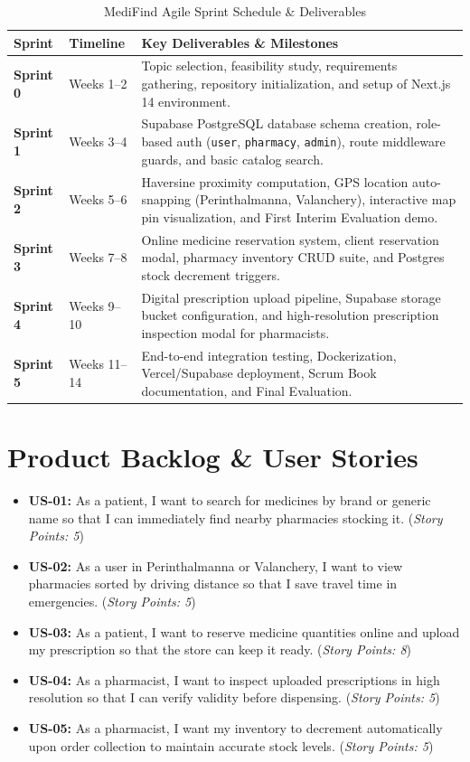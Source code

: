 \documentclass[12pt,a4paper]{report}
\begin{document}
\begin{table}[htbp]
\centering
\caption{MediFind Agile Sprint Schedule \& Deliverables}
\label{tab:sprint_schedule}
\begin{tabular}{p{1.8cm}p{2.5cm}p{10.5cm}}
\toprule
\textbf{Sprint} & \textbf{Timeline} & \textbf{Key Deliverables \& Milestones} \\
\midrule
\textbf{Sprint 0} & Weeks 1--2 & Topic selection, feasibility study, requirements gathering, repository initialization, and setup of Next.js 14 environment. \\
\textbf{Sprint 1} & Weeks 3--4 & Supabase PostgreSQL database schema creation, role-based auth (\texttt{user}, \texttt{pharmacy}, \texttt{admin}), route middleware guards, and basic catalog search. \\
\textbf{Sprint 2} & Weeks 5--6 & Haversine proximity computation, GPS location auto-snapping (Perinthalmanna, Valanchery), interactive map pin visualization, and First Interim Evaluation demo. \\
\textbf{Sprint 3} & Weeks 7--8 & Online medicine reservation system, client reservation modal, pharmacy inventory CRUD suite, and Postgres stock decrement triggers. \\
\textbf{Sprint 4} & Weeks 9--10 & Digital prescription upload pipeline, Supabase storage bucket configuration, and high-resolution prescription inspection modal for pharmacists. \\
\textbf{Sprint 5} & Weeks 11--14 & End-to-end integration testing, Dockerization, Vercel/Supabase deployment, Scrum Book documentation, and Final Evaluation. \\
\bottomrule
\end{tabular}
\end{table}

\section{Product Backlog & User Stories}
\begin{itemize}
    \item \textbf{US-01:} As a patient, I want to search for medicines by brand or generic name so that I can immediately find nearby pharmacies stocking it. (\textit{Story Points: 5})
    \item \textbf{US-02:} As a user in Perinthalmanna or Valanchery, I want to view pharmacies sorted by driving distance so that I save travel time in emergencies. (\textit{Story Points: 5})
    \item \textbf{US-03:} As a patient, I want to reserve medicine quantities online and upload my prescription so that the store can keep it ready. (\textit{Story Points: 8})
    \item \textbf{US-04:} As a pharmacist, I want to inspect uploaded prescriptions in high resolution so that I can verify validity before dispensing. (\textit{Story Points: 5})
    \item \textbf{US-05:} As a pharmacist, I want my inventory to decrement automatically upon order collection to maintain accurate stock levels. (\textit{Story Points: 5})
\end{itemize}
\end{document}

